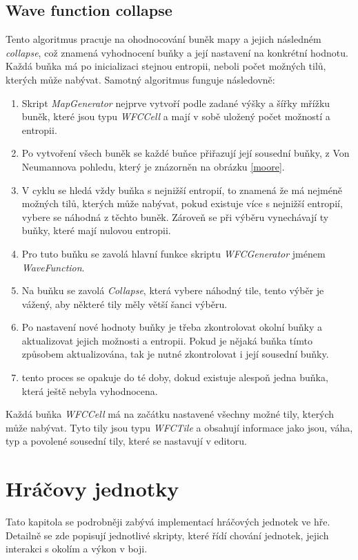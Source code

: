 \subsection{Wave function collapse}
\label{WFCImplement}
Tento algoritmus pracuje na ohodnocování buněk mapy a jejich následném \textit{collapse}, což znamená vyhodnocení buňky a její nastavení na konkrétní hodnotu. Každá buňka má po inicializaci stejnou entropii, neboli počet možných tilů, kterých může nabývat. Samotný algoritmus funguje následovně:

\begin{enumerate}
	\item Skript \textit{MapGenerator} nejprve vytvoří podle zadané výšky a šířky mřížku buněk, které jsou typu \textit{WFCCell} a mají v sobě uložený počet možností a entropii.
	\item Po vytvoření všech buněk se každé buňce přiřazují její sousední buňky, z Von Neumannova pohledu, který je znázorněn na obrázku \ref{moore}.
	\item V cyklu se hledá vždy buňka s nejnižší entropií, to znamená že má nejméně možných tilů, kterých může nabývat, pokud existuje více s nejnižší entropií, vybere se náhodná z těchto buněk. Zároveň se při výběru vynechávají ty buňky, které mají nulovou entropii.
	\item Pro tuto buňku se zavolá hlavní funkce skriptu \textit{WFCGenerator} jménem \textit{WaveFunction}. 
	\item Na buňku se zavolá \textit{Collapse}, která vybere náhodný tile, tento výběr je vážený, aby některé tily měly větší šanci výběru.
	\item Po nastavení nové hodnoty buňky je třeba zkontrolovat okolní buňky a aktualizovat jejich možnosti a entropii. Pokud je nějaká buňka tímto způsobem aktualizována, tak je nutné zkontrolovat i její sousední buňky.
	\item tento proces se opakuje do té doby, dokud existuje alespoň jedna buňka, která ještě nebyla vyhodnocena.
\end{enumerate}

Každá buňka \textit{WFCCell} má na začátku nastavené všechny možné tily, kterých může nabývat. Tyto tily jsou typu \textit{WFCTile} a obsahují informace jako jsou, váha, typ a povolené sousední tily, které se nastavují v editoru.

\section{Hráčovy jednotky}
Tato kapitola se podrobněji zabývá implementací hráčových jednotek ve hře. Detailně se zde popisují jednotlivé skripty, které řídí chování jednotek, jejich interakci s okolím a výkon v boji.

